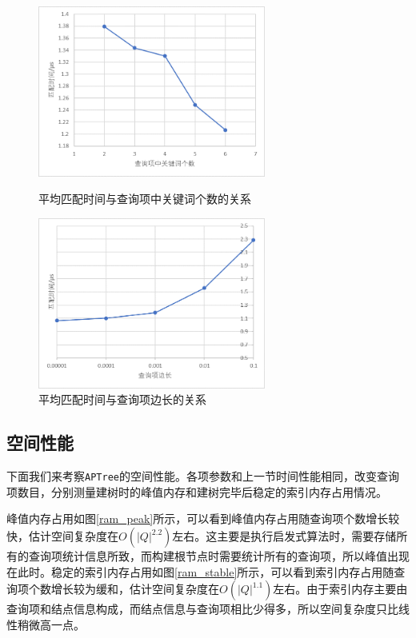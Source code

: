 \documentclass[UTF8]{ctexart}
\begin{document}
\begin{figure}[htbp]
    \centering
    \begin{minipage}[t]{8cm}
        \centering
        \includegraphics[width=7.5cm]{match_nk.png}
        \caption{平均匹配时间与查询项中关键词个数的关系}
        \label{match_nk}
    \end{minipage}
    \begin{minipage}[t]{8cm}
        \centering
        \includegraphics[width=7.5cm]{match_reg.png}
        \caption{平均匹配时间与查询项边长的关系}
        \label{match_reg}
    \end{minipage}
\end{figure}

\subsection{空间性能}
下面我们来考察\texttt{APTree}的空间性能。各项参数和上一节时间性能相同，改变查询项数目，分别测量建树时的峰值内存和建树完毕后稳定的索引内存占用情况。

峰值内存占用如图\ref{ram_peak}所示，可以看到峰值内存占用随查询项个数增长较快，估计空间复杂度在$O(|Q|^{2.2})$左右。这主要是执行启发式算法时，需要存储所有的查询项统计信息所致，而构建根节点时需要统计所有的查询项，所以峰值出现在此时。稳定的索引内存占用如图\ref{ram_stable}所示，可以看到索引内存占用随查询项个数增长较为缓和，估计空间复杂度在$O(|Q|^{1.1})$左右。由于索引内存主要由查询项和结点信息构成，而结点信息与查询项相比少得多，所以空间复杂度只比线性稍微高一点。
\end{document}
